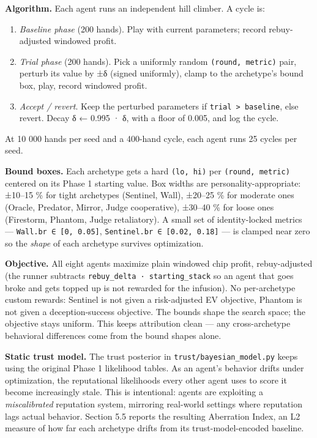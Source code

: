 \documentclass[
]{article}
\providecommand{\tightlist}{%
  \setlength{\itemsep}{0pt}\setlength{\parskip}{0pt}}
\begin{document}
\textbf{Algorithm.} Each agent runs an independent hill climber. A cycle
is:

\begin{enumerate}
\def\labelenumi{\arabic{enumi}.}
\tightlist
\item
  \emph{Baseline phase} (200 hands). Play with current parameters;
  record rebuy-adjusted windowed profit.
\item
  \emph{Trial phase} (200 hands). Pick a uniformly random
  \texttt{(round,\ metric)} pair, perturb its value by ±δ (signed
  uniformly), clamp to the archetype's bound box, play, record windowed
  profit.
\item
  \emph{Accept / revert}. Keep the perturbed parameters if
  \texttt{trial\ \textgreater{}\ baseline}, else revert. Decay δ ← 0.995
  · δ, with a floor of 0.005, and log the cycle.
\end{enumerate}

At 10 000 hands per seed and a 400-hand cycle, each agent runs 25 cycles
per seed.

\textbf{Bound boxes.} Each archetype gets a hard \texttt{(lo,\ hi)} per
\texttt{(round,\ metric)} centered on its Phase 1 starting value. Box
widths are personality-appropriate: ±10--15 \% for tight archetypes
(Sentinel, Wall), ±20--25 \% for moderate ones (Oracle, Predator,
Mirror, Judge cooperative), ±30--40 \% for loose ones (Firestorm,
Phantom, Judge retaliatory). A small set of identity-locked metrics ---
\texttt{Wall.br\ ∈\ {[}0,\ 0.05{]}},
\texttt{Sentinel.br\ ∈\ {[}0.02,\ 0.18{]}} --- is clamped near zero so
the \emph{shape} of each archetype survives optimization.

\textbf{Objective.} All eight agents maximize plain windowed chip
profit, rebuy-adjusted (the runner subtracts
\texttt{rebuy\_delta\ ·\ starting\_stack} so an agent that goes broke
and gets topped up is not rewarded for the infusion). No per-archetype
custom rewards: Sentinel is not given a risk-adjusted EV objective,
Phantom is not given a deception-success objective. The bounds shape the
search space; the objective stays uniform. This keeps attribution clean
--- any cross-archetype behavioral differences come from the bound
shapes alone.

\textbf{Static trust model.} The trust posterior in
\texttt{trust/bayesian\_model.py} keeps using the original Phase 1
likelihood tables. As an agent's behavior drifts under optimization, the
reputational likelihoods every other agent uses to score it become
increasingly stale. This is intentional: agents are exploiting a
\emph{miscalibrated} reputation system, mirroring real-world settings
where reputation lags actual behavior. Section 5.5 reports the resulting
Aberration Index, an L2 measure of how far each archetype drifts from
its trust-model-encoded baseline.
\end{document}
